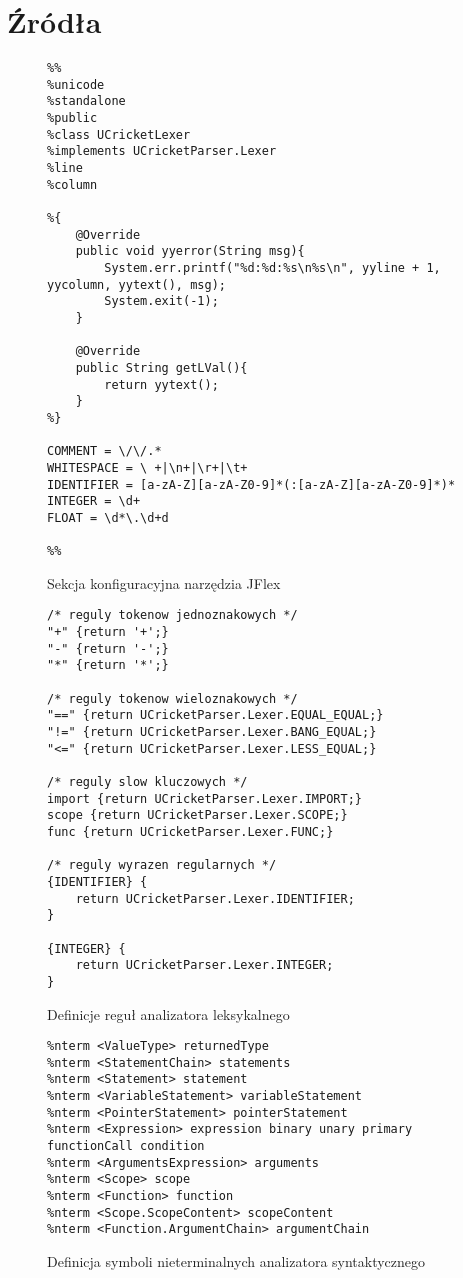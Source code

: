 \chapter{Źródła}
\begin{figure}[H]
\begin{lstlisting}
%%
%unicode
%standalone
%public
%class UCricketLexer
%implements UCricketParser.Lexer
%line
%column

%{
    @Override
    public void yyerror(String msg){
        System.err.printf("%d:%d:%s\n%s\n", yyline + 1, yycolumn, yytext(), msg);
        System.exit(-1);
    }

    @Override
    public String getLVal(){
        return yytext();
    }
%}

COMMENT = \/\/.*
WHITESPACE = \ +|\n+|\r+|\t+
IDENTIFIER = [a-zA-Z][a-zA-Z0-9]*(:[a-zA-Z][a-zA-Z0-9]*)*
INTEGER = \d+
FLOAT = \d*\.\d+d

%%
\end{lstlisting}
\caption{Sekcja konfiguracyjna narzędzia JFlex}
\label{fig:lst:lexer-konfiguracja}
\end{figure}

\begin{figure}
\begin{lstlisting}
/* reguly tokenow jednoznakowych */
"+" {return '+';}
"-" {return '-';}
"*" {return '*';}

/* reguly tokenow wieloznakowych */
"==" {return UCricketParser.Lexer.EQUAL_EQUAL;}
"!=" {return UCricketParser.Lexer.BANG_EQUAL;}
"<=" {return UCricketParser.Lexer.LESS_EQUAL;} 

/* reguly slow kluczowych */
import {return UCricketParser.Lexer.IMPORT;}
scope {return UCricketParser.Lexer.SCOPE;}
func {return UCricketParser.Lexer.FUNC;}

/* reguly wyrazen regularnych */
{IDENTIFIER} {
    return UCricketParser.Lexer.IDENTIFIER;
}

{INTEGER} {
    return UCricketParser.Lexer.INTEGER;
}
\end{lstlisting}
\caption{Definicje reguł analizatora leksykalnego}
\label{fig:lst:lexer-reguły}
\end{figure}

\begin{figure}
\begin{lstlisting}
%nterm <ValueType> returnedType
%nterm <StatementChain> statements
%nterm <Statement> statement
%nterm <VariableStatement> variableStatement
%nterm <PointerStatement> pointerStatement
%nterm <Expression> expression binary unary primary functionCall condition
%nterm <ArgumentsExpression> arguments
%nterm <Scope> scope
%nterm <Function> function
%nterm <Scope.ScopeContent> scopeContent
%nterm <Function.ArgumentChain> argumentChain
\end{lstlisting}
\caption{Definicja symboli nieterminalnych analizatora syntaktycznego}
\label{fig:lst:parser-nterms}
\end{figure}

